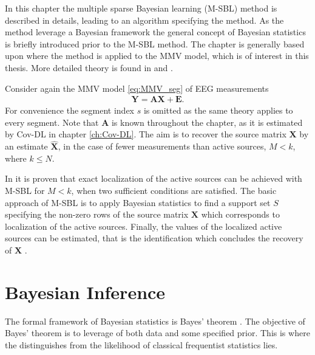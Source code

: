 In this chapter the multiple sparse Bayesian learning (M-SBL) method is described in details, leading to an algorithm specifying the method. As the method leverage a Bayesian framework the general concept of Bayesian statistics is briefly introduced prior to the M-SBL method. The chapter is generally based upon \cite{Balkan2014} where the method is applied to the MMV model, which is of interest in this thesis. More detailed theory is found in \cite{phd_wipf} and \cite{article_wipf}.

Consider again the MMV model \eqref{eq:MMV_seg} of EEG measurements
\begin{align}
\mathbf{Y} = \mathbf{AX} + \mathbf{E}.\label{eq:MSBL_MMV}
\end{align}
For convenience the segment index $s$ is omitted as the same theory applies to every segment.  
Note that $\mathbf{A}$ is known throughout the chapter, as it is estimated by Cov-DL in chapter \ref{ch:Cov-DL}.
The aim is to recover the source matrix $\mathbf{X}$ by an estimate $\hat{\mathbf{X}}$, in the case of fewer measurements than active sources, $M < k$, where $k \leq N$. 

In \cite{Balkan2014} it is proven that exact localization of the active sources can be achieved with M-SBL for $M < k$, when two sufficient conditions are satisfied. 
The basic approach of M-SBL is to apply Bayesian statistics to find a support set $S$ specifying the non-zero rows of the source matrix $\mathbf{X}$ which corresponds to localization of the active sources. Finally, the values of the localized active sources can be estimated, that is the identification which concludes the recovery of $\mathbf{X}$ .

\section{Bayesian Inference} 
The formal framework of Bayesian statistics is Bayes' theorem \cite[p. 86]{Kay}. The objective of Bayes' theorem is to leverage of both data and some specified prior. This is where the distinguishes from the likelihood of classical frequentist statistics lies.     

